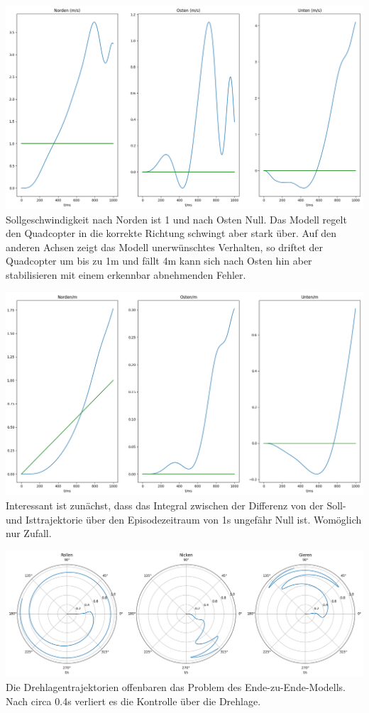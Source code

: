 \begin{center}
	\includegraphics[scale=0.25]{../images/0081 Model E 1.png}{\\Sollgeschwindigkeit nach Norden ist 1 und nach Osten Null. Das Modell regelt den Quadcopter in die korrekte Richtung schwingt aber stark über. Auf den anderen Achsen zeigt das Modell unerwünschtes Verhalten, so driftet der Quadcopter um bis zu 1m und fällt 4m kann sich nach Osten hin aber stabilisieren mit einem erkennbar abnehmenden Fehler.}
\end{center}
\begin{center}
	\includegraphics[scale=0.25]{../images/0080 Model E 2.png}{\\Interessant ist zunächst, dass das Integral zwischen der Differenz von der Soll- und Isttrajektorie über den Episodezeitraum von 1s ungefähr Null ist. Womöglich nur Zufall.}
\end{center}
\begin{center}
	\includegraphics[scale=0.25]{../images/0079 Model E 3.png}{\\Die Drehlagentrajektorien offenbaren das Problem des Ende-zu-Ende-Modells. Nach circa 0.4s verliert es die Kontrolle über die Drehlage.}
\end{center}
